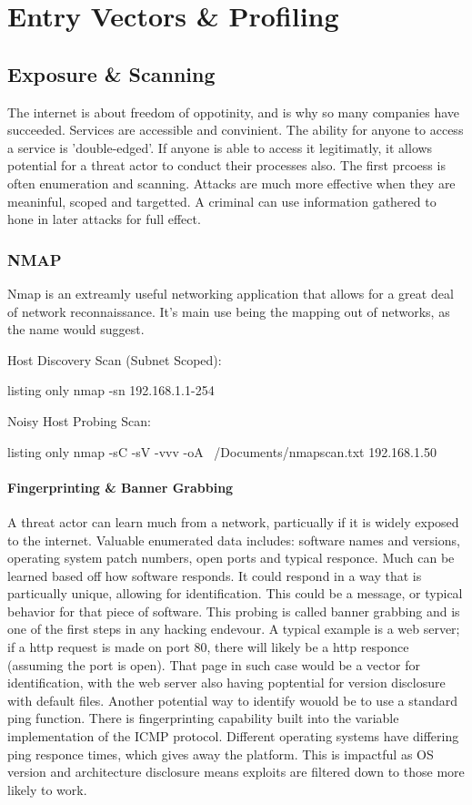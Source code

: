 \chapter{Entry Vectors \& Profiling}
\section{Exposure \& Scanning}
The internet is about freedom of oppotinity, and is why so many companies have succeeded. Services are accessible and convinient. The ability for anyone to access a service is 'double-edged'.
If anyone is able to access it legitimatly, it allows potential for a threat actor to conduct their processes also. The first prcoess is often enumeration and scanning. Attacks are much more effective when they are meaninful, scoped and targetted.
A criminal can use information gathered to hone in later attacks for full effect.  

\subsection{NMAP}
Nmap is an extreamly useful networking application that allows for a great deal of network reconnaissance. It's main use being the mapping out of networks, as the name would suggest.

Host Discovery Scan (Subnet Scoped):
\begin{tcblisting}{listing only}
    nmap -sn 192.168.1.1-254
\end{tcblisting}

Noisy Host Probing Scan:
\begin{tcblisting}{listing only}
nmap -sC -sV -vvv -oA  ~/Documents/nmapscan.txt 192.168.1.50
\end{tcblisting}


\subsubsection{Fingerprinting \& Banner Grabbing}
A threat actor can learn much from a network, particually if it is widely exposed to the internet. Valuable enumerated data includes: software names and versions, operating system patch numbers, open ports and typical responce.
Much can be learned based off how software responds. It could respond in a way that is particually unique, allowing for identification. This could be a message, or typical behavior for that piece of software.
This probing is called banner grabbing and is one of the first steps in any hacking endevour. A typical example is a web server; if a http request is made on port 80, there will likely be a http responce (assuming the port is open).
That page in such case would be a vector for identification, with the web server also having poptential for version disclosure with default files. Another potential way to identify wouold be to use a standard ping function. 
There is fingerprinting capability built into the variable implementation of the ICMP protocol. Different operating systems have differing ping responce times, which gives away the platform. 
This is impactful as OS version and architecture disclosure means exploits are filtered down to those more likely to work.

